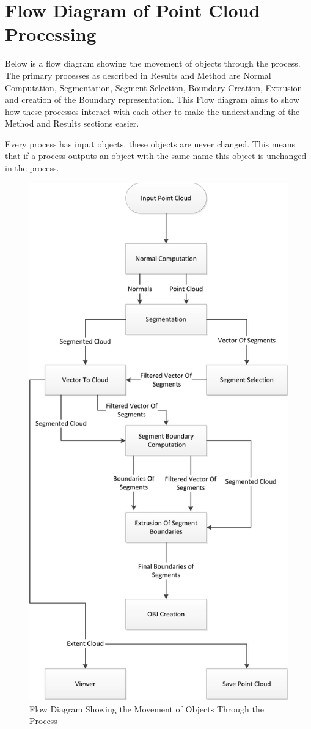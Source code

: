 \appendix
\chapter{Flow Diagram of Point Cloud Processing}
Below is a flow diagram showing the movement of objects through the process. The primary processes as described in Results and Method are Normal Computation, Segmentation, Segment Selection, Boundary Creation, Extrusion and creation of the Boundary representation. This Flow diagram aims to show how these processes interact with each other to make the understanding of the Method and Results sections easier.

Every process has input objects, these objects are never changed. This means that if a process outputs an object with the same name this object is unchanged in the process.

\begin{figure}[p]
\centering
\includegraphics[width=0.7\linewidth]{Includes/images/FlowDiagram}
\caption{Flow Diagram Showing the Movement of Objects Through the Process}
\label{fig:FlowDiagram}
\end{figure}



